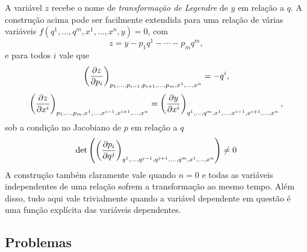 A variável $z$ recebe o nome de \emph{transformação de Legendre} de $y$ em
relação a $q$. A construção acima pode ser facilmente extendida para uma relação
de várias variáveis $f(q^1,\dots,q^m,x^1,\dots,x^n,y)=0$, com
$$z=y-p_1q^1-\cdots-p_mq^m,$$
e para todos $i$ vale que
$$\pd{z}{p_i}{p_1,\dots,p_{i-1},p_{i+1},\dots,p_m,x^1,\dots,x^n}=-q^i,$$
$$\pd{z}{x^i}{p_1,\dots,p_m,x^1,\dots,x^{i-1},x^{i+1},\dots,x^n}=
\pd{y}{x^i}{q^1,\dots,q^m,x^1,\dots,x^{i-1},x^{i+1},\dots,x^n},$$
sob a condição no Jacobiano de $p$ em relação a $q$
$$\det\left(\pd{p_i}{q^j}{q^1,\dots,q^{j-1},q^{j+1},
\dots,q^m,x^1,\dots,x^n}\right)\neq0$$
A construção também claramente vale quando $n=0$ e todas as variáveis
independentes de uma relação sofrem a transformação ao mesmo tempo. Além disso,
tudo aqui vale trivialmente quando a variável dependente em questão é uma função
explícita das variáveis dependentes.

\subsection{Problemas}

